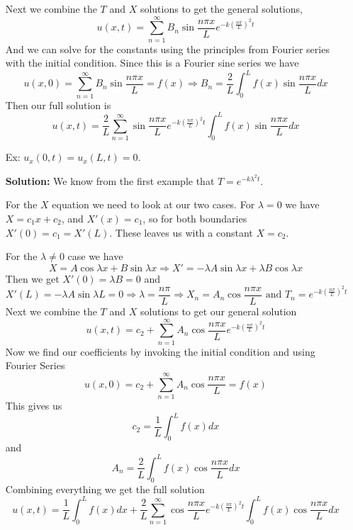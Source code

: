 \documentclass[reqno]{amsart}
\theoremstyle{definition}
\begin{document}
\begin{itemize}
Next we combine the $T$ and $X$ solutions to get the general solutions,
%
\begin{equation}
u(x,t) = \sum_{n=1}^\infty B_n\sin\frac{n\pi x}{L}e^{-k\left(\frac{n\pi}{L}\right)^2 t}
\end{equation}
%
And we can solve for the constants using the principles from Fourier series
with the initial condition.
Since this is a Fourier sine series we have
%
\begin{equation*}
u(x,0) = \sum_{n=1}^\infty B_n\sin\frac{n\pi x}{L} = f(x)
\Rightarrow B_n = \frac{2}{L}\int_0^L f(x)\sin\frac{n\pi x}{L}dx
\end{equation*}
%
Then our full solution is
%
\begin{equation}
u(x,t) = \frac{2}{L}\sum_{n=1}^\infty \sin\frac{n\pi x}{L}e^{-k\left(\frac{n\pi}{L}\right)^2 t}
\int_0^L f(x)\sin\frac{n\pi x}{L}dx
\end{equation}


\item[Ex:  ]  $u_x(0,t) = u_x(L,t) = 0$.

\textbf{Solution:  }  We know from the first example that $T = e^{-k\lambda^2 t}$.

For the $X$ equation we need to look at our two cases.  For $\lambda = 0$ we have
$X = c_1x + c_2$, and $X'(x) = c_1$, so for both boundaries $X'(0) = c_1 = X'(L)$.
These leaves us with a constant $X = c_2$.

For the $\lambda \neq 0$ case we have
%
\begin{equation*}
X = A\cos\lambda x + B\sin\lambda x \Rightarrow
X' = -\lambda A\sin\lambda x + \lambda B\cos\lambda x
\end{equation*}
%
Then we get $X'(0) = \lambda B = 0$ and
%
\begin{equation*}
X'(L) = -\lambda A\sin\lambda L = 0 \Rightarrow \lambda = \frac{n\pi}{L}
\Rightarrow X_n = A_n\cos\frac{n\pi x}{L} \text{  and  }
T_n = e^{-k\left(\frac{n\pi}{L}\right)^2 t}
\end{equation*}
%
Next we combine the $T$ and $X$ solutions to get our general solution
%
\begin{equation}
u(x,t) = c_2 + \sum_{n=1}^\infty A_n\cos\frac{n\pi x}{L}e^{-k\left(\frac{n\pi}{L}\right)^2 t}
\end{equation}
%
Now we find our coefficients by invoking the initial condition and using
Fourier Series
%
\begin{equation*}
u(x,0) = c_2 + \sum_{n=1}^\infty A_n\cos\frac{n\pi x}{L} = f(x)
\end{equation*}
%
This gives us
%
\begin{equation*}
c_2 = \frac{1}{L}\int_0^L f(x)dx
\end{equation*}
%
and
%
\begin{equation*}
A_n = \frac{2}{L}\int_0^L f(x)\cos\frac{n\pi x}{L}dx
\end{equation*}
%
Combining everything we get the full solution
%
\begin{equation}
u(x,t) = \frac{1}{L}\int_0^L f(x)dx + \frac{2}{L}\sum_{n=1}^\infty
\cos\frac{n\pi x}{L}e^{-k\left(\frac{n\pi}{L}\right)^2 t}\int_0^L f(x)\cos\frac{n\pi x}{L}dx
\end{equation}




\end{itemize}
\end{document}
